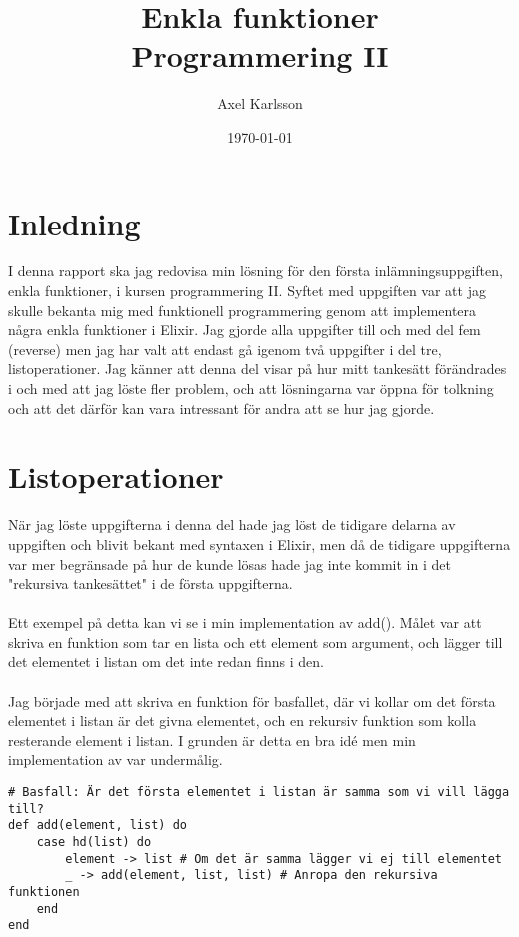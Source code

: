 \documentclass[a4paper,11pt]{article}
\begin{document}
\title{
    \textbf{Enkla funktioner\\
            \small Programmering II}
}
\author{Axel Karlsson}
\date{\today}

\maketitle

\section*{Inledning}
I denna rapport ska jag redovisa min lösning för den första inlämningsuppgiften, enkla funktioner, i kursen programmering II. Syftet med uppgiften var att jag skulle bekanta mig med funktionell programmering genom att implementera några enkla funktioner i Elixir. Jag gjorde alla uppgifter till och med del fem (reverse) men jag har valt att endast gå igenom två uppgifter i del tre, listoperationer. Jag känner att denna del visar på hur mitt tankesätt förändrades i och med att jag löste fler problem, och att lösningarna var öppna för tolkning och att det därför kan vara intressant för andra att se hur jag gjorde.

\section*{Listoperationer}
När jag löste uppgifterna i denna del hade jag löst de tidigare delarna av uppgiften och blivit bekant med syntaxen i Elixir, men då de tidigare uppgifterna var mer begränsade på hur de kunde lösas hade jag inte kommit in i det "rekursiva tankesättet" i de första uppgifterna.\\\\
Ett exempel på detta kan vi se i min implementation av add(). Målet var att skriva en funktion som tar en lista och ett element som argument, och lägger till det elementet i listan om det inte redan finns i den.\\\\
Jag började med att skriva en funktion för basfallet, där vi kollar om det första elementet i listan är det givna elementet, och en rekursiv funktion som kolla resterande element i listan. I grunden är detta en bra idé men min implementation av var undermålig.\pagebreak

\begin{verbatim}
# Basfall: Är det första elementet i listan är samma som vi vill lägga till?
def add(element, list) do
    case hd(list) do
        element -> list # Om det är samma lägger vi ej till elementet
        _ -> add(element, list, list) # Anropa den rekursiva funktionen
    end
end
\end{verbatim}
\end{document}
